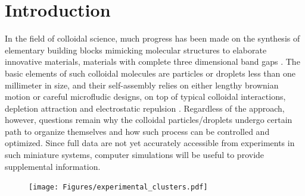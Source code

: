 

\section{Introduction}
\label{intro}

In the field of colloidal science, much progress has been made on the synthesis of elementary building blocks  mimicking molecular structures to elaborate innovative materials, \eg materials with complete three dimensional band gaps \citep{Xia_etal_AM2000, Velev_etal_AM2009, Li_etal_AC2011, Sacanna_etal_COCIS2011}. The basic elements of such colloidal molecules are particles or droplets less than one millimeter in size, and their self-assembly relies on either lengthy brownian motion or careful microfludic designs, on top of typical colloidal interactions, \eg depletion attraction and electrostatic repulsion \citep{Mewis_colloidal, Yi_etal_CM2013, Shen_AS_2016}. Regardless of the approach, however, questions remain why the colloidal particles/droplets undergo certain path to organize themselves and how such process can be controlled and optimized. Since full data are not yet accurately accessible from experiments in such miniature systems, computer simulations will be useful to provide supplemental information.

\begin{figure}[t!]
\centering
  \texttt{[image: Figures/experimental\_clusters.pdf]}
  \caption{}
  \label{fig:exp}
\end{figure}

